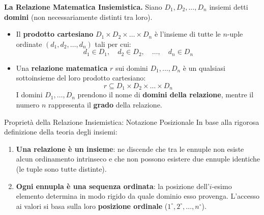 \documentclass[12pt]{extarticle}
\begin{document}
\medskip
\noindent \textbf{La Relazione Matematica Insiemistica.} Siano $D_1, D_2, \dots, D_n$ insiemi detti \textbf{domini} (non necessariamente distinti tra loro).
\begin{itemize}
    \item Il \textbf{prodotto cartesiano} $D_1 \times D_2 \times \dots \times D_n$ è l'insieme di tutte le $n$-uple ordinate $(d_1, d_2, \dots, d_n)$ tali per cui:
    $$d_1 \in D_1, \quad d_2 \in D_2, \quad \dots, \quad d_n \in D_n$$
    \item Una \textbf{relazione matematica} $r$ sui domini $D_1, \dots, D_n$ è un qualsiasi sottoinsieme del loro prodotto cartesiano:
    $$r \subseteq D_1 \times D_2 \times \dots \times D_n$$
    I domini $D_1, \dots, D_n$ prendono il nome di \textbf{domini della relazione}, mentre il numero $n$ rappresenta il \textbf{grado} della relazione.
\end{itemize}

\begin{cbox}{Proprietà della Relazione Insiemistica: Notazione Posizionale}
\noindent In base alla rigorosa definizione della teoria degli insiemi:
\begin{enumerate}
    \item \textbf{Una relazione è un insieme}: ne discende che tra le ennuple non esiste alcun ordinamento intrinseco e che non possono esistere due ennuple identiche (le tuple sono tutte distinte).
    \item \textbf{Ogni ennupla è una sequenza ordinata}: la posizione dell'$i$-esimo elemento determina in modo rigido da quale dominio esso provenga. L'accesso ai valori si basa sulla loro \textbf{posizione ordinale} ($1^\circ, 2^\circ, \dots, n^\circ$).
\end{enumerate}
\end{cbox}
\end{document}

